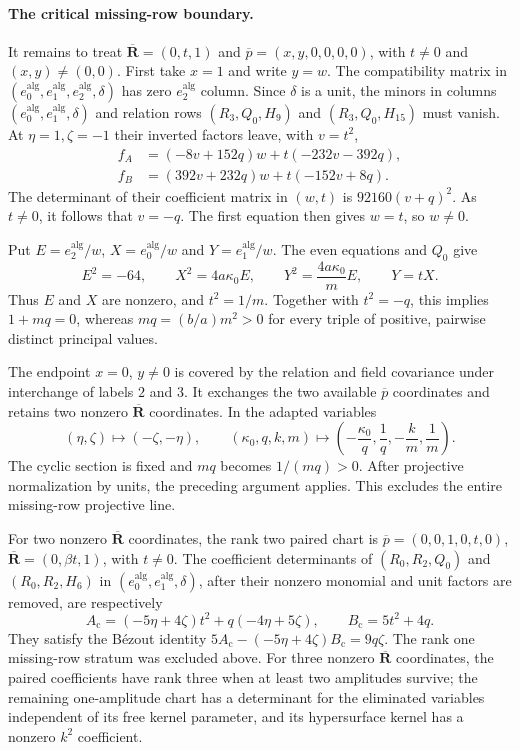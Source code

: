 \documentclass[11pt,a4paper]{article}
\numberwithin{equation}{section}
\theoremstyle{plain}
\theoremstyle{definition}
\theoremstyle{remark}
\begin{document}
\paragraph{The critical missing-row boundary.}
It remains to treat
$\overline{\boldsymbol R}=(0,t,1)$ and
$\overline p=(x,y,0,0,0,0)$, with $t\ne0$ and $(x,y)\ne(0,0)$.
First take $x=1$ and write $y=w$. The compatibility matrix
in $(e_0^{\mathrm{alg}},e_1^{\mathrm{alg}},e_2^{\mathrm{alg}},\delta)$ has zero $e_2^{\mathrm{alg}}$ column. Since $\delta$
is a unit, the minors in columns $(e_0^{\mathrm{alg}},e_1^{\mathrm{alg}},\delta)$ and relation
rows $(R_3,Q_0,H_9)$ and $(R_3,Q_0,H_{15})$ must vanish.
At $\eta =1,\zeta =-1$ their inverted factors leave, with $v=t^2$,
\[
\begin{aligned}
 f_A&=(-8v+152q)w+t(-232v-392q),\\
 f_B&=(392v+232q)w+t(-152v+8q).
\end{aligned}
\]
The determinant of their coefficient matrix in $(w,t)$ is
$92160(v+q)^2$. As $t\ne0$, it follows that $v=-q$.
The first equation then gives $w=t$, so $w\ne0$.

Put $E=e_2^{\mathrm{alg}}/w$, $X=e_0^{\mathrm{alg}}/w$ and $Y=e_1^{\mathrm{alg}}/w$. The even
equations and $Q_0$ give
\[
 E^2=-64,\qquad X^2=4a\kappa_0 E,\qquad
 Y^2=\frac{4a\kappa_0 }{m}E,\qquad Y=tX .
\]
Thus $E$ and $X$ are nonzero, and $t^2=1/m$. Together with
$t^2=-q$, this implies $1+mq=0$, whereas
$mq=(b/a)m^2>0$ for every triple of positive, pairwise distinct principal values.

The endpoint $x=0$, $y\ne0$ is covered by the relation
and field covariance under interchange of labels $2$ and $3$.
It exchanges the two available $\overline p$ coordinates and retains
two nonzero $\overline{\boldsymbol R}$ coordinates. In the adapted variables
\[
 (\eta ,\zeta )\longmapsto(-\zeta ,-\eta ),\qquad
 (\kappa_0 ,q,k,m)\longmapsto
 \left(-\frac{\kappa_0}{q},\frac1q,-\frac km,\frac1m\right).
\]
The cyclic section is fixed and $mq$ becomes $1/(mq)>0$.
After projective normalization by units, the
preceding argument applies. This excludes the entire
missing-row projective line.

For two nonzero $\overline{\boldsymbol R}$ coordinates, the rank two paired
chart is $\overline p=(0,0,1,0,t,0)$,
$\overline{\boldsymbol R}=(0,\beta t,1)$, with $t\ne0$.
The coefficient determinants of $(R_0,R_2,Q_0)$ and $(R_0,R_2,H_6)$
in $(e_0^{\mathrm{alg}},e_1^{\mathrm{alg}},\delta)$, after their nonzero monomial and unit factors
are removed, are respectively
\[
 A_{\mathrm c}=(-5\eta+4\zeta)t^2+q(-4\eta+5\zeta),\qquad
 B_{\mathrm c}=5t^2+4q.
\]
They satisfy the B\'ezout identity
$5A_{\mathrm c}-(-5\eta+4\zeta)B_{\mathrm c}=9q\zeta$. The rank one missing-row stratum was excluded above. For three nonzero $\overline{\boldsymbol R}$ coordinates, the paired coefficients have rank three when at least two amplitudes survive; the remaining one-amplitude chart has a determinant for the eliminated variables independent of its free kernel parameter, and its hypersurface kernel has a nonzero $k^2$ coefficient. 
\end{document}
